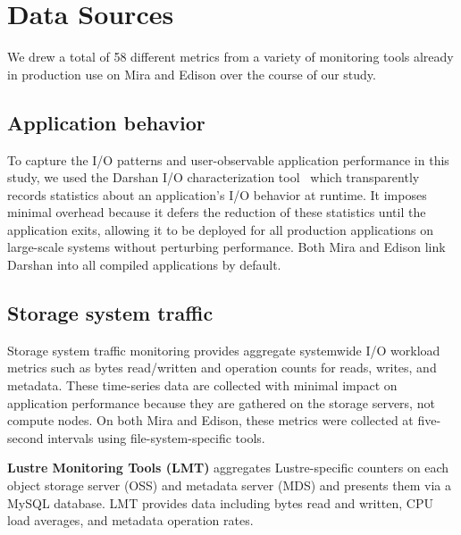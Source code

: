 


\section{Data Sources} \label{sec:methods}

We drew a total of 58 different metrics from a variety
of monitoring tools already in production use on Mira and Edison over the
course of our study.

\subsection{Application behavior} \label{sec:methods/darshan}

To capture the I/O patterns and user-observable application performance in this study, we used the Darshan I/O characterization tool~\cite{carns200924} which transparently records statistics about an application's I/O behavior at runtime.
It imposes minimal overhead because it defers the reduction of these statistics until the application exits,
allowing it to be deployed for all production applications on large-scale systems without perturbing performance.  Both Mira and Edison link Darshan into all compiled applications by default.

\subsection{Storage system traffic} \label{sec:methods/storagesystraffic}

Storage system traffic monitoring provides aggregate systemwide I/O workload metrics such as bytes read/written and operation counts for reads, writes, and metadata.
These time-series data are collected with minimal impact on application performance because they are gathered on the storage servers, not compute nodes.
On both Mira and Edison, these metrics were collected at five-second intervals using file-system-specific tools.  

\label{sec:methods/lmt}
\textbf{Lustre Monitoring Tools (LMT)} aggregates Lustre-specific counters on each object storage server (OSS) and metadata server (MDS) and presents them via a MySQL database.
LMT provides data including bytes read and written, CPU load averages, and metadata operation rates.

